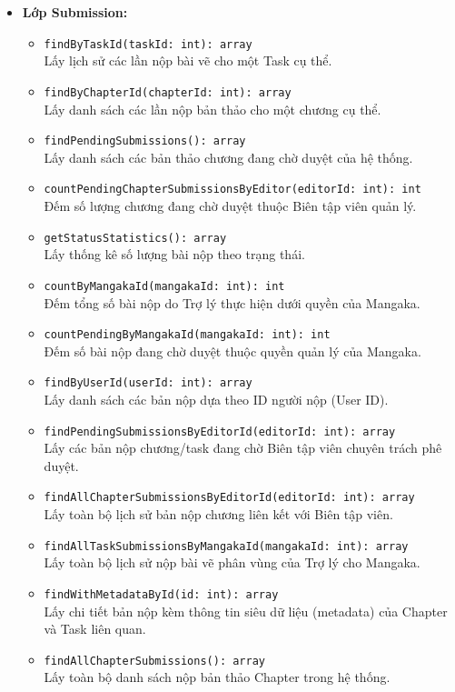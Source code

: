 \begin{itemize}
    \item \textbf{Lớp Submission:}
    \begin{itemize}
        \item \texttt{findByTaskId(taskId: int): array}\\
            Lấy lịch sử các lần nộp bài vẽ cho một Task cụ thể.
        \item \texttt{findByChapterId(chapterId: int): array}\\
            Lấy danh sách các lần nộp bản thảo cho một chương cụ thể.
        \item \texttt{findPendingSubmissions(): array}\\
            Lấy danh sách các bản thảo chương đang chờ duyệt của hệ thống.
        \item \texttt{countPendingChapterSubmissionsByEditor(editorId: int): int}\\
            Đếm số lượng chương đang chờ duyệt thuộc Biên tập viên quản lý.
        \item \texttt{getStatusStatistics(): array}\\
            Lấy thống kê số lượng bài nộp theo trạng thái.
        \item \texttt{countByMangakaId(mangakaId: int): int}\\
            Đếm tổng số bài nộp do Trợ lý thực hiện dưới quyền của Mangaka.
        \item \texttt{countPendingByMangakaId(mangakaId: int): int}\\
            Đếm số bài nộp đang chờ duyệt thuộc quyền quản lý của Mangaka.
        \item \texttt{findByUserId(userId: int): array}\\
            Lấy danh sách các bản nộp dựa theo ID người nộp (User ID).
        \item \texttt{findPendingSubmissionsByEditorId(editorId: int): array}\\
            Lấy các bản nộp chương/task đang chờ Biên tập viên chuyên trách phê duyệt.
        \item \texttt{findAllChapterSubmissionsByEditorId(editorId: int): array}\\
            Lấy toàn bộ lịch sử bản nộp chương liên kết với Biên tập viên.
        \item \texttt{findAllTaskSubmissionsByMangakaId(mangakaId: int): array}\\
            Lấy toàn bộ lịch sử nộp bài vẽ phân vùng của Trợ lý cho Mangaka.
        \item \texttt{findWithMetadataById(id: int): array}\\
            Lấy chi tiết bản nộp kèm thông tin siêu dữ liệu (metadata) của Chapter và Task liên quan.
        \item \texttt{findAllChapterSubmissions(): array}\\
            Lấy toàn bộ danh sách nộp bản thảo Chapter trong hệ thống.
    \end{itemize}


\end{itemize}
